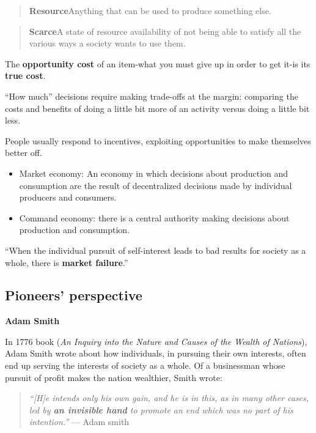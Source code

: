 \documentclass[11pt,]{book}
\providecommand{\tightlist}{%
  \setlength{\itemsep}{0pt}\setlength{\parskip}{0pt}}
\theoremstyle{definition}
\theoremstyle{definition}
\theoremstyle{definition}
\theoremstyle{remark}
\begin{document}
\begin{quote}
\textbf{Resource}\newline Anything that can be used to produce something
else.
\end{quote}

\begin{quote}
\textbf{Scarce}\newline A state of resource availability of not being
able to satisfy all the various ways a society wants to use them.
\end{quote}

The \textbf{opportunity cost} of an item-what you must give up in order
to get it-is its \textbf{true cost}.

``How much'' decisions require making trade-offs at the margin:
comparing the costs and benefits of doing a little bit more of an
activity versus doing a little bit less.

People usually respond to incentives, exploiting opportunities to make
themselves better off.

\begin{itemize}
\tightlist
\item
  Market economy: An economy in which decisions about production and
  consumption are the result of decentralized decisions made by
  individual producers and consumers.
\item
  Command economy: there is a central authority making decisions about
  production and consumption.
\end{itemize}

``When the individual pursuit of self-interest leads to bad results for
society as a whole, there is \textbf{market failure}.''

\subsection{Pioneers' perspective}\label{pioneers-perspective}

\textbf{Adam Smith}

In 1776 book (\emph{An Inquiry into the Nature and Causes of the Wealth
of Nations}), Adam Smith wrote about how individuals, in pursuing their
own interests, often end up serving the interests of society as a whole.
Of a businessman whose pursuit of profit makes the nation wealthier,
Smith wrote:

\begin{quote}
\emph{``{[}H{]}e intends only his own gain, and he is in this, as in
many other cases, led by \textbf{an invisible hand} to promote an end
which was no part of his intention.''} --- Adam smith
\end{quote}
\end{document}
